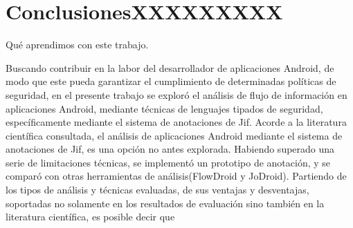 \section{ConclusionesXXXXXXXXX}
Qué aprendimos con este trabajo.\newline

Buscando contribuir en la labor del desarrollador de aplicaciones Android, de
modo que este pueda garantizar el cumplimiento de determinadas políticas de
seguridad, en el presente trabajo se exploró el análisis de flujo de información
en aplicaciones Android, mediante técnicas de lenguajes tipados de seguridad,
específicamente mediante el sistema de anotaciones de Jif.\newline 
Acorde a la literatura científica consultada, el análisis de aplicaciones
Android mediante el sistema de anotaciones de Jif, es una opción no antes
explorada.\newline
Habiendo superado una serie de limitaciones técnicas, se implementó un
prototipo de anotación, y se comparó con otras herramientas de
análisis(FlowDroid y JoDroid).
Partiendo de los tipos de análisis y técnicas evaluadas, de sus ventajas y
desventajas, soportadas no solamente en los resultados de evaluación sino
también en la literatura científica, es posible decir que 



